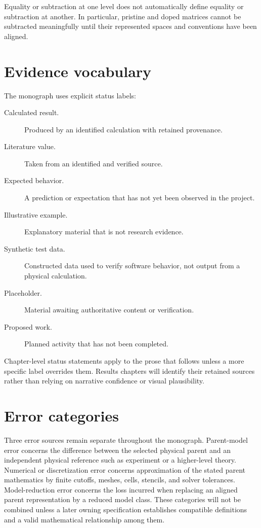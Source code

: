 Equality or subtraction at one level does not automatically define equality or
subtraction at another. In particular, pristine and doped matrices cannot be
subtracted meaningfully until their represented spaces and conventions have
been aligned.

\section*{Evidence vocabulary}


The monograph uses explicit status labels:

\begin{description}
  \item[Calculated result.] Produced by an identified calculation with retained
    provenance.
  \item[Literature value.] Taken from an identified and verified source.
  \item[Expected behavior.] A prediction or expectation that has not yet been
    observed in the project.
  \item[Illustrative example.] Explanatory material that is not research
    evidence.
  \item[Synthetic test data.] Constructed data used to verify software behavior,
    not output from a physical calculation.
  \item[Placeholder.] Material awaiting authoritative content or verification.
  \item[Proposed work.] Planned activity that has not been completed.
\end{description}

Chapter-level status statements apply to the prose that follows unless a more
specific label overrides them. Results chapters will identify their retained
sources rather than relying on narrative confidence or visual plausibility.

\section*{Error categories}


Three error sources remain separate throughout the monograph. Parent-model
error concerns the difference between the selected physical parent and an
independent physical reference such as experiment or a higher-level theory.
Numerical or discretization error concerns approximation of the stated parent
mathematics by finite cutoffs, meshes, cells, stencils, and solver tolerances.
Model-reduction error concerns the loss incurred when replacing an aligned
parent representation by a reduced model class. These categories will not be
combined unless a later owning specification establishes compatible definitions
and a valid mathematical relationship among them.

